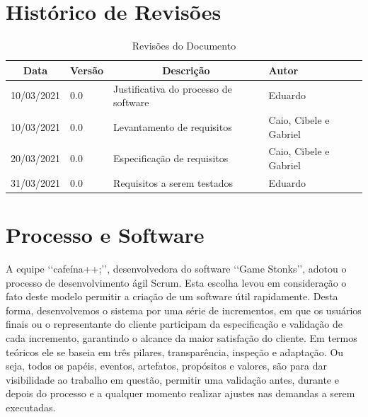 \documentclass[a4paper, 12pt]{article}
\begin{document}
\newpage
{}

\section{Histórico de Revisões}

\begin{table}[H]
\centering
\begin{tabular}{|l|l|l|l|}
\hline
\multicolumn{1}{|c|}{Data} & \multicolumn{1}{c|}{Versão} & \multicolumn{1}{c|}{Descrição}                 & Autor       \\ \hline
10/03/2021                 & 0.0                         & Justificativa do processo de software          & Eduardo     \\ \hline
10/03/2021                 & 0.0                         & Levantamento de requisitos                     & Caio, Cibele e Gabriel            \\ \hline 
20/03/2021                 & 0.0                         & Especificação de requisitos                     & Caio, Cibele e Gabriel            \\ \hline
31/03/2021                  & 0.0                        & Requisitos a serem testados                 & Eduardo                            \\     \hline 
\end{tabular}
\caption{Revisões do Documento}
\label{tab:my-table}
\end{table}

\section{Processo e Software}

A equipe ‘‘cafeína++;’’, desenvolvedora do software ‘‘Game Stonks’’, adotou o processo de desenvolvimento ágil Scrum. Esta escolha levou em consideração o fato deste modelo permitir a criação de um software útil rapidamente. Desta forma, desenvolvemos o sistema por uma série de incrementos, em que os usuários finais ou o representante do cliente participam da especificação e validação de cada incremento, garantindo o alcance da maior satisfação do cliente. Em termos teóricos ele se baseia em três pilares, transparência, inspeção e adaptação. Ou seja, todos os papéis, eventos, artefatos, propósitos e valores, são para dar visibilidade ao trabalho em questão, permitir uma validação antes, durante e depois do processo e a qualquer momento realizar ajustes nas demandas a serem executadas.
\end{document}
